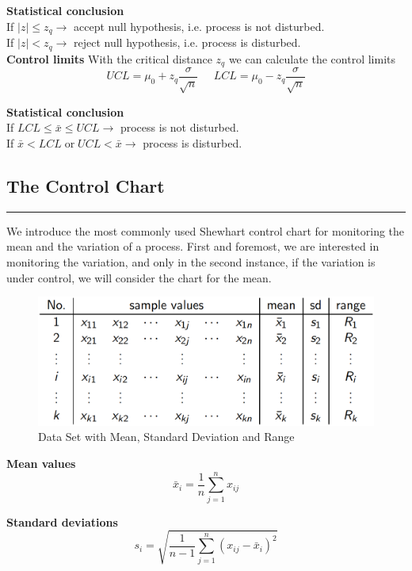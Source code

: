 \textbf{Statistical conclusion}\\
If $|z| \leq z_q \rightarrow$ accept null hypothesis, i.e. process is not disturbed.\\
If $|z|   <  z_q \rightarrow$ reject null hypothesis, i.e. process is disturbed.\\


\textbf{Control limits}
With the critical distance $z_q$ we can calculate the control limits
\begin{equation}
  UCL = \mu_0 + z_q \frac{\sigma}{\sqrt{n}} \;\;\;\;\; LCL = \mu_0 - z_q \frac{\sigma}{\sqrt{n}}
\end{equation}

\textbf{Statistical conclusion}\\
If $LCL \leq \bar{x} \leq UCL \rightarrow$ process is not disturbed.\\
If $\bar{x} < LCL \;\text{or}\; UCL < \bar{x} \rightarrow$ process is disturbed.\\

\subsection{The Control Chart}
\noindent\rule[\linienAbstand]{\linewidth}{\linienDicke}
We introduce the most commonly used Shewhart control chart for monitoring the mean and the variation of a process. First and foremost, we are interested in monitoring the variation, and only in the second instance, if the variation is under control, we will consider the chart for the mean.
\begin{figure}[H]
  \centering
  \includegraphics[width = 0.8\linewidth]{Pics/2.1.png}
  \caption{Data Set with Mean, Standard Deviation and Range}
  \label{2.1}
\end{figure}

\textbf{Mean values}
\begin{equation}
  \bar{x}_i = \frac{1}{n} \sum_{j=1}^n x_{ij}
\end{equation}

\textbf{Standard deviations}
\begin{equation}
  s_i = \sqrt{\frac{1}{n-1} \sum_{j=1}^n \left(x_{ij} - \bar{x}_i\right)^2}
\end{equation}

